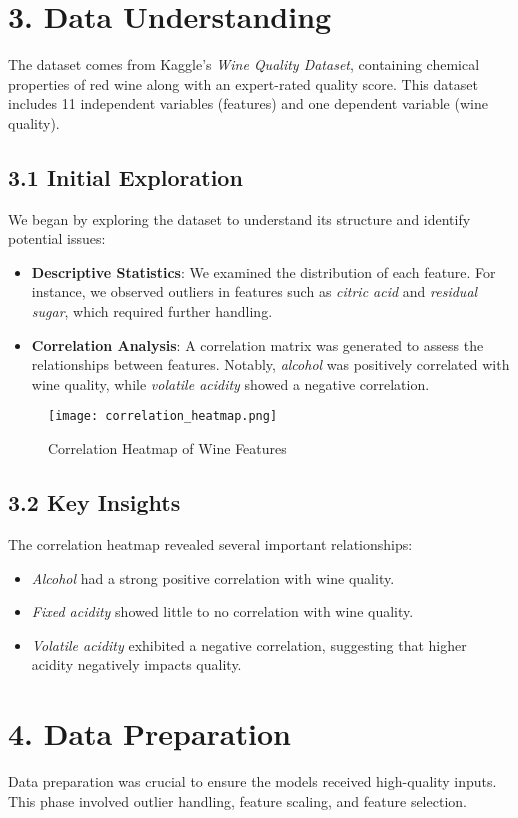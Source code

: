 \documentclass{article}
\begin{document}
\section{3. Data Understanding}
The dataset comes from Kaggle's \textit{Wine Quality Dataset}, containing chemical properties of red wine along with an expert-rated quality score. This dataset includes 11 independent variables (features) and one dependent variable (wine quality).

\subsection{3.1 Initial Exploration}
We began by exploring the dataset to understand its structure and identify potential issues:
\begin{itemize}
    \item \textbf{Descriptive Statistics}: We examined the distribution of each feature. For instance, we observed outliers in features such as \textit{citric acid} and \textit{residual sugar}, which required further handling.
    \item \textbf{Correlation Analysis}: A correlation matrix was generated to assess the relationships between features. Notably, \textit{alcohol} was positively correlated with wine quality, while \textit{volatile acidity} showed a negative correlation.
\end{itemize}

\begin{figure}[h]
    \centering
    \texttt{[image: correlation\_heatmap.png]}
    \caption{Correlation Heatmap of Wine Features}
\end{figure}

\subsection{3.2 Key Insights}
The correlation heatmap revealed several important relationships:
\begin{itemize}
    \item \textit{Alcohol} had a strong positive correlation with wine quality.
    \item \textit{Fixed acidity} showed little to no correlation with wine quality.
    \item \textit{Volatile acidity} exhibited a negative correlation, suggesting that higher acidity negatively impacts quality.
\end{itemize}

\section{4. Data Preparation}
Data preparation was crucial to ensure the models received high-quality inputs. This phase involved outlier handling, feature scaling, and feature selection.
\end{document}
